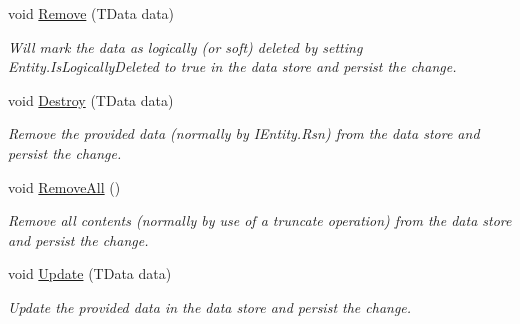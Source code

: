 \begin{DoxyCompactItemize}
void \hyperlink{classCqrs_1_1DataStores_1_1InProcessDataStore_a43a93c614a403181e0641106ca9509d6_a43a93c614a403181e0641106ca9509d6}{Remove} (T\+Data data)
\begin{DoxyCompactList}\small\item\em Will mark the {\itshape data}  as logically (or soft) deleted by setting Entity.\+Is\+Logically\+Deleted to true in the data store and persist the change. \end{DoxyCompactList}\item 
void \hyperlink{classCqrs_1_1DataStores_1_1InProcessDataStore_a1fc7a3935f52087f3703b652e77f0b75_a1fc7a3935f52087f3703b652e77f0b75}{Destroy} (T\+Data data)
\begin{DoxyCompactList}\small\item\em Remove the provided {\itshape data}  (normally by I\+Entity.\+Rsn) from the data store and persist the change. \end{DoxyCompactList}\item 
void \hyperlink{classCqrs_1_1DataStores_1_1InProcessDataStore_acd350f7abef7311064434ae31a50755b_acd350f7abef7311064434ae31a50755b}{Remove\+All} ()
\begin{DoxyCompactList}\small\item\em Remove all contents (normally by use of a truncate operation) from the data store and persist the change. \end{DoxyCompactList}\item 
void \hyperlink{classCqrs_1_1DataStores_1_1InProcessDataStore_af70e6f6e5aabc24ee12ef3d2bcd3bf60_af70e6f6e5aabc24ee12ef3d2bcd3bf60}{Update} (T\+Data data)
\begin{DoxyCompactList}\small\item\em Update the provided {\itshape data}  in the data store and persist the change. \end{DoxyCompactList}\end{DoxyCompactItemize}
